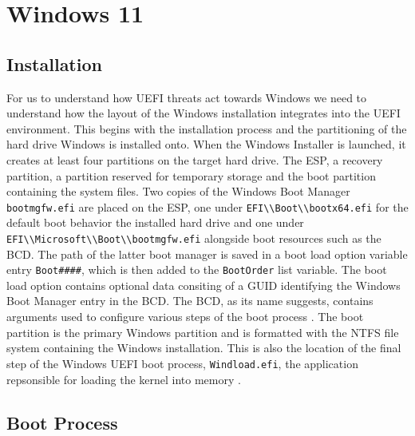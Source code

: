 
\chapter{Windows 11}


\section{Installation}

For us to understand how UEFI threats act towards Windows we need to understand how the layout of the Windows installation integrates into the UEFI environment.
This begins with the installation process and the partitioning of the hard drive Windows is installed onto.
When the Windows Installer is launched, it creates at least four partitions on the target hard drive.
The \acf{ESP}, a recovery partition, a partition reserved for temporary storage and the boot partition containing the system files.
Two copies of the Windows Boot Manager \lstinline{bootmgfw.efi} are placed on the \ac{ESP}, one under \lstinline{EFI\\Boot\\bootx64.efi} for the default boot behavior the installed hard drive and one under \lstinline{EFI\\Microsoft\\Boot\\bootmgfw.efi} alongside boot resources such as the \ac{BCD}.
The path of the latter boot manager is saved in a boot load option variable entry \lstinline{Boot####}, which is then added to the \lstinline{BootOrder} list variable.
The boot load option contains optional data consiting of a GUID identifying the Windows Boot Manager entry in the \ac{BCD}.
The \ac{BCD}, as its name suggests, contains arguments used to configure various steps of the boot process \cite[12. The Windows Boot Manager]{windows-internals-7-part2}.
The boot partition is the primary Windows partition and is formatted with the \ac{NTFS} file system containing the Windows installation.
This is also the location of the final step of the Windows UEFI boot process, \lstinline{Windload.efi}, the application repsonsible for loading the kernel into memory \cite[12. The Windows OS Loader]{windows-internals-7-part2}.

\section{Boot Process}

